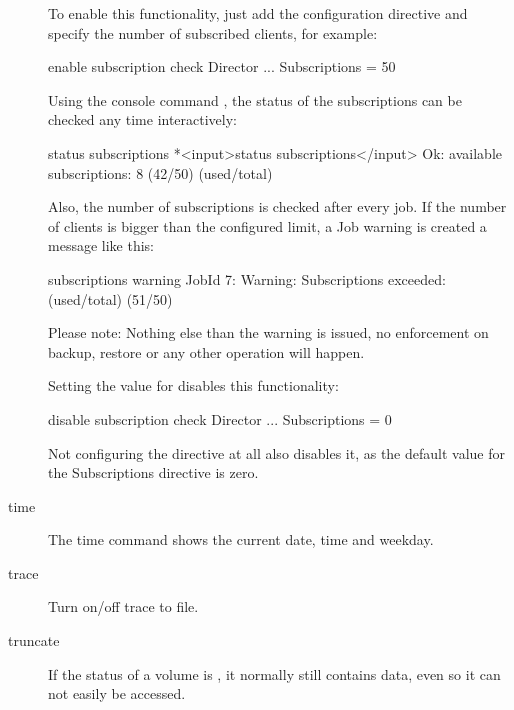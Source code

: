 \begin{description}
To enable this functionality, just add the configuration  directive
and specify the number of subscribed clients, for example:
\begin{bconfig}{enable subscription check}
Director {
   ...
   Subscriptions = 50
}
\end{bconfig}

Using the console command , the status of
the subscriptions can be checked any time interactively:

\begin{bconsole}{status subscriptions}
*<input>status subscriptions</input>
Ok: available subscriptions: 8 (42/50) (used/total)
\end{bconsole}

Also, the number of subscriptions is checked after every job.
If the number of clients is bigger than the configured limit, a Job warning is
created a message like this:
\begin{bconsole}{subscriptions warning}
JobId 7: Warning: Subscriptions exceeded: (used/total) (51/50)
\end{bconsole}

Please note: Nothing else than the warning is issued, no enforcement on
backup, restore or any other operation will happen.

Setting the value for  disables this functionality:
\begin{bconfig}{disable subscription check}
Director {
   ...
   Subscriptions = 0
}
\end{bconfig}

Not configuring the directive at all also disables it, as the default value for the Subscriptions directive is zero.

\item [time]
   The time command shows the current date, time and weekday.

\item [trace]
   Turn on/off trace to file.

\item [truncate]
   \label{bcommandTruncate}

    If the status of a volume is ,
    it normally still contains data, even so it can not easily be accessed.


\end{description}
